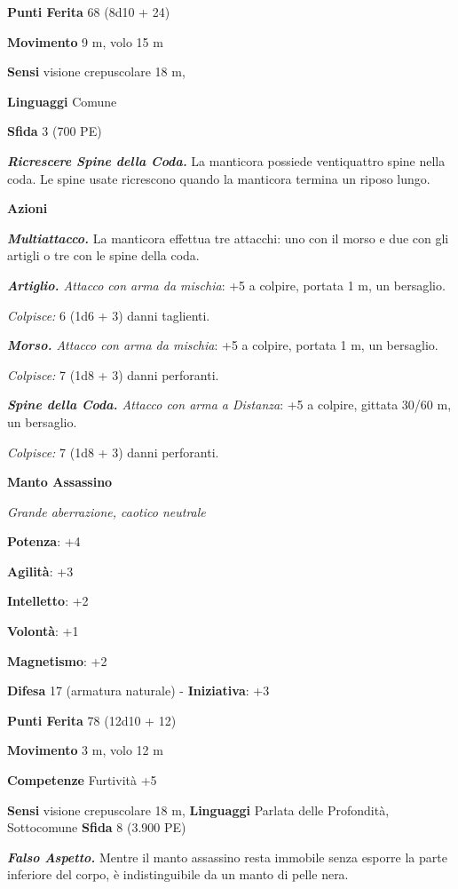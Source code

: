 \begin{multicols}{2}
\textbf{Punti Ferita} 68 (8d10 + 24)

\textbf{Movimento} 9 m, volo 15 m

\textbf{Sensi} visione crepuscolare 18 m, 

\textbf{Linguaggi} Comune

\textbf{Sfida} 3 (700 PE)\smallskip

\emph{\textbf{Ricrescere Spine della Coda.}} La manticora possiede
ventiquattro spine nella coda. Le spine usate ricrescono quando la
manticora termina un riposo lungo.

\smallskip\textbf{Azioni}

\emph{\textbf{Multiattacco.}} La manticora effettua tre attacchi: uno
con il morso e due con gli artigli o tre con le spine della coda.

\emph{\textbf{Artiglio.} Attacco con arma da mischia}: +5 a colpire,
portata 1 m, un bersaglio.

\emph{Colpisce:} 6 (1d6 + 3) danni taglienti.

\emph{\textbf{Morso.} Attacco con arma da mischia}: +5 a colpire,
portata 1 m, un bersaglio.

\emph{Colpisce:} 7 (1d8 + 3) danni perforanti.

\emph{\textbf{Spine della Coda.} Attacco con arma a Distanza}: +5 a
colpire, gittata 30/60 m, un bersaglio.

\emph{Colpisce:} 7 (1d8 + 3) danni perforanti.


\textbf{Manto Assassino}

\emph{Grande aberrazione, caotico neutrale}

\textbf{Potenza}: +4

\textbf{Agilità}: +3

\textbf{Intelletto}: +2

\textbf{Volontà}: +1

\textbf{Magnetismo}: +2

\textbf{Difesa} 17 (armatura naturale) - \textbf{Iniziativa}: +3

\textbf{Punti Ferita} 78 (12d10 + 12)

\textbf{Movimento} 3 m, volo 12 m

\textbf{Competenze} Furtività +5

\textbf{Sensi} visione crepuscolare 18 m, 
\textbf{Linguaggi} Parlata delle Profondità, Sottocomune \textbf{Sfida}
8 (3.900 PE)\smallskip

\emph{\textbf{Falso Aspetto.}} Mentre il manto assassino resta immobile
senza esporre la parte inferiore del corpo, è indistinguibile da un
manto di pelle nera.


\end{multicols}
